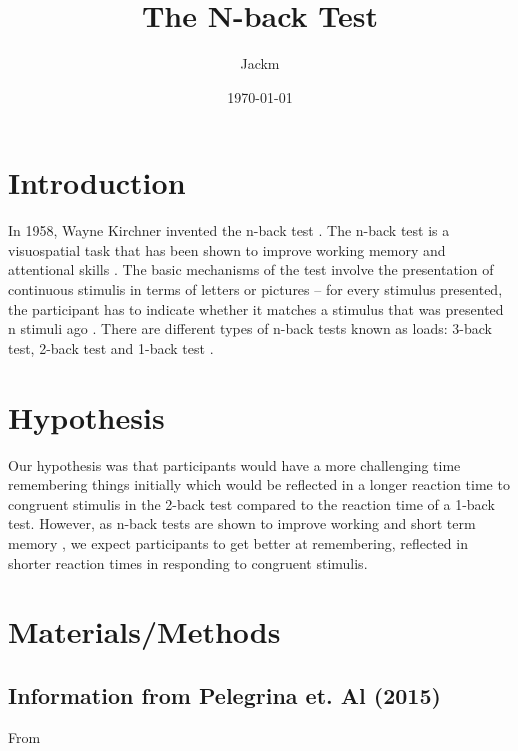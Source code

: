 \documentclass{article}
\author{Jackm}
\date{\today}
\title{The N-back Test}
\begin{document}
\maketitle
\tableofcontents


\section{Introduction}
\label{sec:org85dd691}

In 1958, Wayne Kirchner invented the n-back test \cite{COULACOGLOU201791}. The n-back test is a visuospatial task that has been shown to improve working memory and attentional skills \cite{COLOM2013712}. The basic mechanisms of the test involve the presentation of continuous stimulis in terms of letters or pictures – for every stimulus presented, the participant has to indicate whether it matches a stimulus that was presented n stimuli ago \cite{Kane}. There are different types of n-back tests known as loads: 3-back test, 2-back test and 1-back test \cite{Forns}.

\section{Hypothesis}
\label{sec:org53ed98f}

Our hypothesis was that participants would have a more challenging time remembering things initially which would be reflected in a longer reaction time to congruent stimulis in the 2-back test compared to the reaction time of a 1-back test. However, as n-back tests are shown to improve working and short term memory \cite{LEONDOMINGUEZ2015167}, we expect participants to get better at remembering, reflected in shorter reaction times in responding to congruent stimulis.

\section{Materials/Methods}
\label{sec:orgfb6c50b}
\subsection{Information from Pelegrina et. Al (2015)}
\label{sec:orgd24ac4d}
From \cite{NormativeData}
\end{document}
